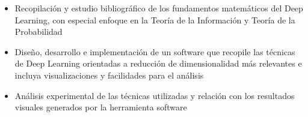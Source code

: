 \begin{itemize}
\tightlist
\item
  Recopilación y estudio bibliográfico de los fundamentos matemáticos
  del Deep Learning, con especial enfoque en la Teoría de la Información
  y Teoría de la Probabilidad
\item
  Diseño, desarrollo e implementación de un software que recopile las
  técnicas de Deep Learning orientadas a reducción de dimensionalidad
  más relevantes e incluya visualizaciones y facilidades para el
  análisis
\item
  Análisis experimental de las técnicas utilizadas y relación con los
  resultados visuales generados por la herramienta software
\end{itemize}
